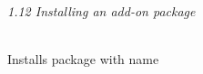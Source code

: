 \textit{1.12 Installing an add-on package} \\
\\
\begin{minipage}[t]{.4\textwidth}
\vspace*{-8pt}
\end{minipage}
\begin{minipage}[t]{.6\textwidth}
Installs package with name  	
\end{minipage}
\vspace*{.5cm}

\clearpage %